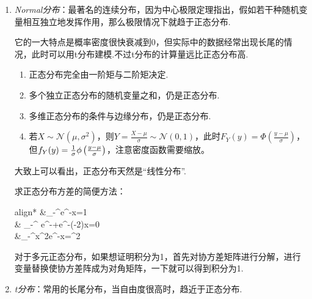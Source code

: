 \begin{enumerate}
	\item \emph{Normal分布}：最著名的连续分布，因为中心极限定理指出，假如若干种随机变量相互独立地发挥作用，那么极限情况下就趋于正态分布.
	
	它的一大特点是概率密度很快衰减到0，但实际中的数据经常出现长尾的情况，此时可以用t分布建模.不过t分布的计算量远比正态分布高.
	\begin{property}
	
	\begin{enumerate}
		\item 正态分布完全由一阶矩与二阶矩决定.
		\item 多个独立正态分布的随机变量之和，仍是正态分布.
		\item 多维正态分布的条件与边缘分布，仍是正态分布.
        \item 若$X\sim \mathcal{N}(\mu, \sigma^2)$，则$Y=\frac{X-\mu}{\sigma}\sim\mathcal{N}(0,1)$，此时$F_Y(y)=\Phi\left(\frac{y-\mu}{\sigma}\right)$，但$f_Y(y)=\frac{1}{\sigma}\phi\left(\frac{y-\mu}{\sigma}\right)$，注意密度函数需要缩放。
	\end{enumerate}
\end{property}
	大致上可以看出，正态分布天然是“线性分布”.
	
	求正态分布方差的简便方法：
	
	\begin{empheq}{align*}
		&\int_{-\infty}^{\infty}e^{-}\dif x=1\\
		& \int_{-\infty}^{\infty} e^{-}+e^{-}(-2)\dif x=0\\
		&\int_{-\infty}^{\infty}x^2e^{-}\dif x=\sigma^2
	\end{empheq}
	
	对于多元正态分布，如果想证明积分为1，首先对协方差矩阵进行分解，进行变量替换使协方差阵成为对角矩阵，一下就可以得到积分为1.
	
	\item \emph{t分布}：常用的长尾分布，当自由度很高时，趋近于正态分布.
    

\end{enumerate}

